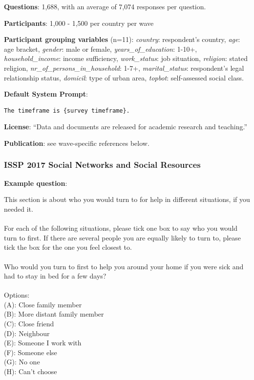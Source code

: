 \documentclass{article} %
\begin{document}
\textbf{Questions}: 1,688, with an average of 7,074 responses per question.

\textbf{Participants}: 1,000 - 1,500 per country per wave

\textbf{Participant grouping variables} (n=11):
\textit{country}: respondent’s country,
\textit{age}: age bracket,
\textit{gender}: male or female,
\textit{years\_of\_education}: 1-10+,
\textit{household\_income}: income sufficiency,
\textit{work\_status}: job situation,
\textit{religion}: stated religion,
\textit{nr\_of\_persons\_in\_household}: 1-7+,
\textit{marital\_status}: respondent's legal relationship status,
\textit{domicil}: type of urban area,
\textit{topbot}: self-assessed social class.

\textbf{Default System Prompt}:
\begin{examplebox}
\begin{Verbatim}[fontfamily=\rmdefault]
The timeframe is {survey timeframe}.
\end{Verbatim}
\end{examplebox}

\textbf{License}: ``Data and documents are released for academic research and teaching.''

\textbf{Publication}: see wave-specific references below.

\subsubsection{ISSP 2017 Social Networks and Social Resources}
\textbf{Example question}:

\begin{examplebox}
This section is about who you would turn to for help in different situations, if you needed it.
\\\\
For each of the following situations, please tick one box to say who you would turn to first. If there are several people you are equally likely to turn to, please tick the box for the one you feel closest to.
\\\\
Who would you turn to first to help you around your home if you were sick and had to stay in bed for a few days?
\\\\
Options:\\
(A): Close family member\\
(B): More distant family member\\
(C): Close friend\\
(D): Neighbour\\
(E): Someone I work with\\
(F): Someone else\\
(G): No one\\
(H): Can't choose
\end{examplebox}
\end{document}
